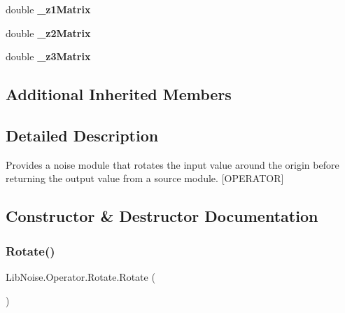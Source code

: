 \begin{DoxyCompactItemize}
\mbox{\label{class_lib_noise_1_1_operator_1_1_rotate_ab30194b76843f99cd9f125984e72c6a5}} 
double {\bfseries \+\_\+z1\+Matrix}
\item 
\mbox{\label{class_lib_noise_1_1_operator_1_1_rotate_ab8d1fec28db68e7b8b89fd961d6a6d07}} 
double {\bfseries \+\_\+z2\+Matrix}
\item 
\mbox{\label{class_lib_noise_1_1_operator_1_1_rotate_ac7ee2188b91f8296c229385e49441f5c}} 
double {\bfseries \+\_\+z3\+Matrix}
\end{DoxyCompactItemize}
\subsection*{Additional Inherited Members}


\subsection{Detailed Description}
Provides a noise module that rotates the input value around the origin before returning the output value from a source module. \mbox{[}O\+P\+E\+R\+A\+T\+OR\mbox{]} 



\subsection{Constructor \& Destructor Documentation}
\mbox{\label{class_lib_noise_1_1_operator_1_1_rotate_a6914f8024dd7bd60a9c2627b4b5f85ae}} 
\subsubsection{\texorpdfstring{Rotate()}{Rotate()}\hspace{0.1cm}{\footnotesize\ttfamily [1/3]}}
{\footnotesize\ttfamily Lib\+Noise.\+Operator.\+Rotate.\+Rotate (\begin{DoxyParamCaption}{ }\end{DoxyParamCaption})}



